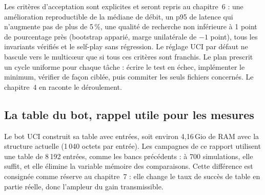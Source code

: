Les crit\`eres d'acceptation sont explicites et seront repris au
chapitre~6 : une am\'elioration reproductible de la m\'ediane de d\'ebit, un
p95 de latence qui n'augmente pas de plus de 5\,\%, une qualit\'e de recherche
non inf\'erieure \`a 1 point de pourcentage pr\`es (bootstrap appari\'e,
marge unilat\'erale de $-1$ point), tous les invariants v\'erifi\'es et le
self-play sans r\'egression. Le r\'eglage UCI par d\'efaut ne bascule vers le
multic\oe{}ur que si tous ces crit\`eres sont franchis. Le plan prescrit un
cycle uniforme pour chaque t\^ache : \'ecrire le test en \'echec,
impl\'ementer le minimum, v\'erifier de fa\c{c}on cibl\'ee, puis commiter les
seuls fichiers concern\'es. Le chapitre~4 en raconte le d\'eroulement.

\subsection{La table du bot, rappel utile pour les mesures}

Le bot UCI construit sa table avec  entr\'ees,
soit environ 4,16\,Gio de RAM avec la structure actuelle (1\,040 octets par
entr\'ee). Les campagnes de ce rapport utilisent une table de 8\,192 entr\'ees,
comme les bancs pr\'ec\'edents : \`a 700 simulations, elle suffit, et elle
\'elimine la variable m\'emoire des comparaisons. Cette diff\'erence est
consign\'ee comme r\'eserve au chapitre~7 : elle change le taux de succ\`es de
table en partie r\'eelle, donc l'ampleur du gain transmissible.
